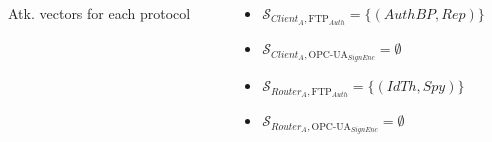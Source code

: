 \documentclass{beamer}
\newcommand{\ftpauth}{FTP$_{Auth}$\xspace}
\newcommand{\opcuasignenc}{OPC-UA$_{SignEnc}$\xspace}
\begin{document}
\begin{frame}[fragile]{}
\begin{tcolorbox}[adjusted title={\centering\large Attack models}]
\begin{columns}[T]
\begin{column}{.65\textwidth}
\begin{tcolorbox}
\begin{columns}[c]
\begin{column}{.3\textwidth}
\begin{table}[htb]
                                \vspace{-.75em}
                                \caption{Atk. vectors for each protocol}
                                \label{tab:ex_cap}
                            \end{table}
                        \end{column}
                        \hspace{.7cm}
                        \begin{column}{.4\textwidth}
                            \begin{itemize}
                                \item $\mathcal{S}_{Client_{A},\text{\ftpauth}} = \{ (AuthBP, Rep) \}$
                                \item $\mathcal{S}_{Client_{A},\text{\opcuasignenc}} = \emptyset$
                                \item $\mathcal{S}_{Router_{A},\text{\ftpauth}} = \{ (IdTh, Spy) \}$
                                \item $\mathcal{S}_{Router_{A},\text{\opcuasignenc}} = \emptyset$
                            \end{itemize}
                        \end{column}
                    \end{columns}
               \end{tcolorbox}
            \end{column}
        \end{columns}
    \end{tcolorbox}
    \vfill
\end{frame}
\end{document}
